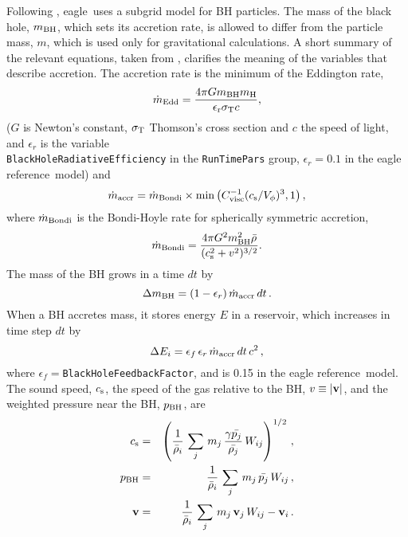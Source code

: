 \documentclass[10pt, a4paper]{article}
\newcommand{\eagle}{{\sc eagle}}
\newcommand{\REF}{{\sc eagle reference}}
\begin{document}
Following \cite{2005MNRAS.361..776S}, \eagle\ uses a subgrid model for BH particles. The mass of the black hole, $m_{\rm BH}$, which sets its accretion rate, is allowed to differ from the particle mass, $m$, which is used only for gravitational calculations. A short summary of the relevant equations, taken from \cite{2015MNRAS.446..521S}, clarifies the meaning of the variables that describe accretion. The accretion rate is the minimum of the Eddington rate,
\begin{equation}
\dot{m}_{\rm Edd} = \frac{4\pi G m_{\rm BH} m_{\rm
H}}{\epsilon_{\rm r} \sigma_{\rm T} c},
\end{equation}
($G$ is Newton's constant, $\sigma_{\rm T}$ Thomson's cross section and $c$ the speed of light, and $\epsilon_r$ is the variable \\ \texttt{BlackHoleRadiativeEfficiency} in the \texttt{RunTimePars} group, $\epsilon_r=0.1$ in the \REF\ model) and
\begin{equation}
\dot{m}_{\rm accr} = \dot{m}_{\rm Bondi} \times \min\left
(C_{\rm visc}^{-1}(c_{\rm s}/V_\phi)^3,1 \right ),
\label{EqMdotAccr}
\end{equation}
where $\dot{m}_{\rm Bondi}$ is the Bondi-Hoyle rate for spherically symmetric accretion,
\begin{equation}
\dot{m}_{\rm Bondi} = \frac{4\pi G^2 m_{\rm BH}^2 \bar{\rho}}{(c_{\rm s}^2 + v^2)^{3/2}}.
\end{equation}
The mass of the BH grows in a time $dt$ by
\begin{equation}
\Delta m_{\rm BH} = (1-\epsilon_r)\,\dot m_{\rm accr}\,dt\,.
\end{equation}
When a BH accretes mass, it stores energy $E$ in a reservoir, which increases in time step $dt$ by
\begin{equation}
\Delta E_i = \epsilon_f\,\epsilon_r\,\dot m_{\rm accr}\,dt\,c^2\,,
\end{equation}
where $\epsilon_f=$\texttt{BlackHoleFeedbackFactor}, and is 0.15 in the \REF\ model. The sound speed, $c_{\rm s}$, the speed of the gas relative to the BH, $v\equiv |{\bf v}|$, and the weighted pressure near the BH, $p_{\rm BH}$, are
\begin{eqnarray}
c_{\rm s} &=& \left({1\over\bar{\rho}_i}\, \sum_j\,
m_j\,{\gamma\bar{p_j}\over \bar{\rho_j}}\,W_{ij}\right)^{1/2}\,,\nonumber\\
p_{\rm BH} &=& {1\over\bar{\rho}_i}\, \sum_j\,
m_j\,\bar{p_j}\,W_{ij}\,,\nonumber\\ {\bf v}&=&{1\over\bar{\rho}_i}\, \sum_j\,
m_j\, {\bf v}_j \,W_{ij}-{\bf v}_i\,.
\end{eqnarray}
\end{document}

